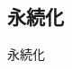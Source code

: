 \documentclass[../../../main]{subfiles}
\begin{document}
    \subsection{永続化}\label{subsec:phraseology-persistence}

    永続化
\end{document}
